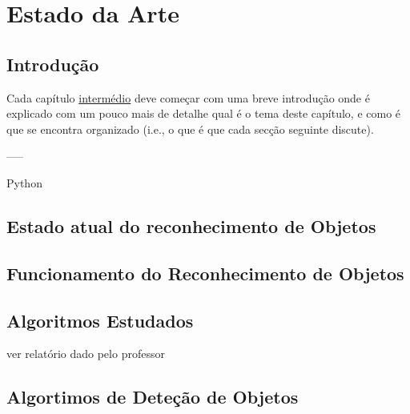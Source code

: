 \chapter{Estado da Arte}
\label{chap:estado-da-arte}

\section{Introdução}
\label{chap2:sec:intro}
Cada capítulo \underline{intermédio} deve começar com uma breve introdução onde é explicado com um pouco mais de detalhe qual é o tema deste capítulo, e como é que se encontra organizado (i.e., o que é que cada secção seguinte discute). 



-----

Python

\section{Estado atual do reconhecimento de Objetos}
\label{chap2:sec:estado}





\section{Funcionamento do Reconhecimento de Objetos}
\label{chap2:sec:funcionamento}




\section{Algoritmos Estudados}
\label{chap2:sec:algoritmos}


ver relatório dado pelo professor




\section{Algortimos de Deteção de Objetos}
\label{chap2:subsec:algoritmosdetecao}


